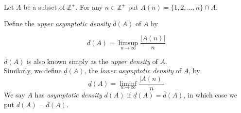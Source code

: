 \documentclass[12pt]{article}
\begin{document}
Let $A$ be a subset of $\mathbb{Z}^{+}$.  For any $n \in \mathbb{Z}^{+}$ put
$A(n)=\{1,2,\ldots,n\} \cap A$.

Define the {\em upper asymptotic density} $\overline{d}(A)$ of $A$ by

$$ \overline{d}(A) = \limsup_{n \rightarrow \infty} \frac{|A(n)|}{n} $$

$\overline{d}(A)$ is also known simply as the {\em upper density} of
$A$.\\
Similarly, we define $\underline{d}(A)$, the {\em lower asymptotic density} of
$A$, by
\[ \underline{d}(A) = \liminf_{n \rightarrow \infty} \frac{ |A(n)| }{n} \]
We say $A$ has {\em asymptotic density} $d(A)$ if
$\underline{d}(A)=\overline{d}(A)$, in which case we put
$d(A)=\overline{d}(A)$.
\end{document}
